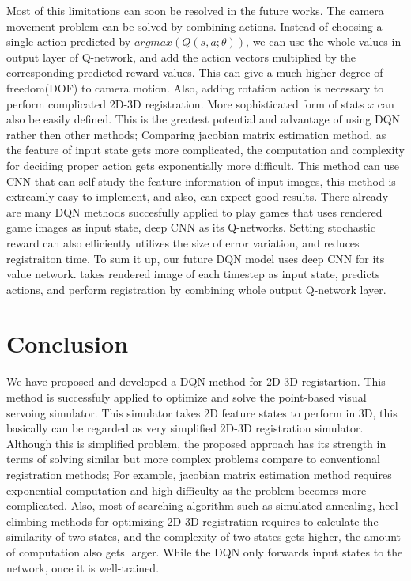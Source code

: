 \documentclass[10pt]{article}
\begin{document}
  Most of this limitations can soon be resolved in the future works. The camera movement problem can be solved by combining actions. Instead of choosing a single action predicted by $argmax(Q(s, a; \theta ))$, we can use the whole values in output layer of Q-network, and add the action vectors multiplied by the corresponding predicted reward values. This can give a much higher degree of freedom(DOF) to camera motion. Also, adding rotation action is necessary to perform complicated 2D-3D registration. More sophisticated form of stats $x$ can also be easily defined. This is the greatest potential and advantage of using DQN rather then other methods; Comparing jacobian matrix estimation method, as the feature of input state gets more complicated, the computation and complexity for deciding proper action gets exponentially more difficult.
  This method can use CNN that can self-study the feature information of input images, this method is extreamly easy to implement, and also, can expect good results. There already are many DQN methods succesfully applied to play games that uses rendered game images as input state, deep CNN as its Q-networks\cite{ref2}. Setting stochastic reward can also efficiently utilizes the size of error variation, and reduces registraiton time. To sum it up, our future DQN model uses deep CNN for its value network. takes rendered image of each timestep as input state, predicts actions, and perform registration by combining whole output Q-network layer.



\section{Conclusion}

We have proposed and developed a DQN method for 2D-3D registartion. This method is successfuly applied to optimize and solve the point-based visual servoing simulator. This simulator takes 2D feature states to perform in 3D, this basically can be regarded as very simplified 2D-3D registration simulator. Although this is simplified problem, the proposed approach has its strength in terms of solving similar but more complex problems compare to conventional registration methods; For example, jacobian matrix estimation method requires exponential computation and high difficulty as the problem becomes more complicated. Also, most of searching algorithm such as simulated annealing, heel climbing methods for optimizing 2D-3D registration requires to calculate the similarity of two states, and the complexity of two states gets higher, the amount of computation also gets larger. While the DQN only forwards input states to the network, once it is well-trained.
\end{document}
